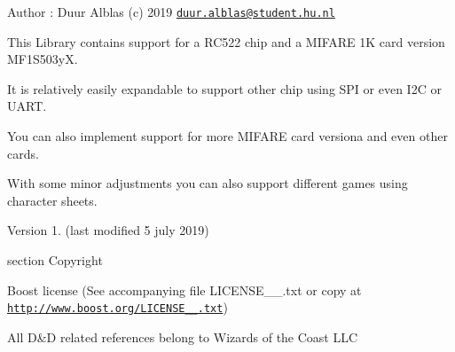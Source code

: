Author \+: Duur Alblas (c) 2019 \href{mailto:duur.alblas@student.hu.nl}{\tt duur.\+alblas@student.\+hu.\+nl}

This Library contains support for a R\+C522 chip and a M\+I\+F\+A\+RE 1K card version M\+F1\+S503yX.

It is relatively easily expandable to support other chip using S\+PI or even I2C or U\+A\+RT.

You can also implement support for more M\+I\+F\+A\+RE card versiona and even other cards.

With some minor adjustments you can also support different games using character sheets.

Version 1. (last modified 5 july 2019)

section Copyright

Boost license (See accompanying file L\+I\+C\+E\+N\+S\+E\+\_\+\_.\+txt or copy at \href{http://www.boost.org/LICENSE_1_0.txt}{\tt http\+://www.\+boost.\+org/\+L\+I\+C\+E\+N\+S\+E\+\_\+\_.\+txt})

All D\&D related references belong to Wizards of the Coast L\+LC 